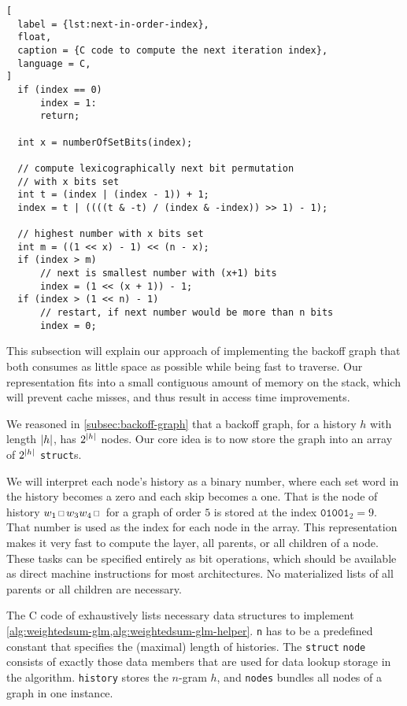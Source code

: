 \begin{lstlisting}[
  label = {lst:next-in-order-index},
  float,
  caption = {C code to compute the next iteration index},
  language = C,
]
  if (index == 0)
      index = 1:
      return;

  int x = numberOfSetBits(index);

  // compute lexicographically next bit permutation
  // with x bits set
  int t = (index | (index - 1)) + 1;
  index = t | ((((t & -t) / (index & -index)) >> 1) - 1);

  // highest number with x bits set
  int m = ((1 << x) - 1) << (n - x);
  if (index > m)
      // next is smallest number with (x+1) bits
      index = (1 << (x + 1)) - 1;
  if (index > (1 << n) - 1)
      // restart, if next number would be more than n bits
      index = 0;
\end{lstlisting}

This subsection will explain our approach of implementing the backoff graph that
both consumes as little space as possible while being fast to traverse.
Our representation fits into a small contiguous amount of memory on the stack,
which will prevent cache misses, and thus result in access time improvements.

We reasoned in \cref{subsec:backoff-graph} that a backoff graph, for a history
$h$ with length ${\left|h\right|}$, has $2^{\left|h\right|}$ nodes.
Our core idea is to now store the graph into an array of $2^{\left|h\right|}$
\texttt{struct}s.

We will interpret each node's history as a binary number, where each set word
in the history becomes a zero and each skip becomes a one.
That is the node of history $w_1 \Skp w_3 w_4 \Skp$ for a graph of order $5$
is stored at the index $\texttt{01001}_2 = 9$.
That number is used as the index for each node in the array.
This representation makes it very fast to compute the layer, all parents, or
all children of a node.
These tasks can be specified entirely as bit operations, which should be
available as direct machine instructions for most architectures.
No materialized lists of all parents or all children are necessary.

The C code of  exhaustively lists necessary data
structures to implement \cref{alg:weightedsum-glm,alg:weightedsum-glm-helper}.
\texttt{n} has to be a predefined constant that specifies the (maximal) length
of histories.
The \texttt{struct} \texttt{node} consists of exactly those data members that are
used for data lookup storage in the algorithm.
\texttt{history} stores the $n$-gram $h$, and \texttt{nodes} bundles all nodes
of a graph in one instance.

